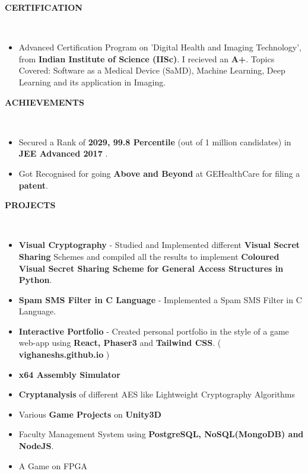 \documentclass[a4paper,10pt]{article}
\newcommand{\isep}{-2 pt}
\newcommand{\lsep}{-0.6cm}
\newcommand{\resheading}[1]{{\small \colorbox{mygrey}{\begin{minipage}{0.975\textwidth}{\textbf{#1 \vphantom{p\^{E}}}}\end{minipage}}}}
\begin{document}
\vspace{-5pt}

\resheading{\textbf{CERTIFICATION} }\\[\lsep]
\vspace{1.0pt}
\begin{itemize} \itemsep \isep
\item Advanced Certification Program on 'Digital Health and Imaging Technology', from \textbf{Indian Institute of Science (IISc)}. I recieved an \textbf{A+}. Topics Covered: Software as a Medical Device (SaMD), Machine Learning, Deep Learning and its application in Imaging.
\end{itemize}

\vspace{-5pt}

\resheading{\textbf{ACHIEVEMENTS} }\\[\lsep]
\vspace{1.0pt}

\begin{itemize} 
\setlength{\itemsep}{1pt}
\setlength{\parskip}{0pt}
\setlength{\parsep}{0pt}
\item Secured a Rank of \textbf{2029, 99.8 Percentile} (out of 1 million candidates) in \textbf{JEE Advanced 2017} .
\item Got Recognised for going \textbf{Above and Beyond} at GEHealthCare for filing a \textbf{patent}.
\end{itemize}
\vspace{-5pt}

\resheading{\textbf{PROJECTS} }\\[\lsep]
\vspace{1.0pt}
\begin{itemize}
\setlength{\itemsep}{1pt}
\setlength{\parskip}{0pt}
\setlength{\parsep}{0pt}
\item \textbf{Visual Cryptography} - Studied and Implemented different \textbf{Visual Secret Sharing} Schemes and compiled all the results to implement \textbf{Coloured Visual Secret Sharing Scheme for General Access Structures in Python}. 	
\item \textbf{Spam SMS Filter in C Language} - Implemented a Spam SMS Filter in C Language.
\item \textbf{Interactive Portfolio} - Created personal portfolio in the style of a game web-app using \textbf{React, Phaser3} and \textbf{Tailwind CSS}. (\textbf{ vighaneshs.github.io} )
\item \textbf{x64 Assembly Simulator}
\item \textbf{Cryptanalysis} of different AES like Lightweight Cryptography Algorithms
\item Various \textbf{Game Projects} on \textbf{Unity3D}
\item Faculty Management System using \textbf{PostgreSQL, NoSQL(MongoDB) and NodeJS}.
\item A Game on FPGA
\end{itemize}
\vspace{-5pt}
\end{document}

